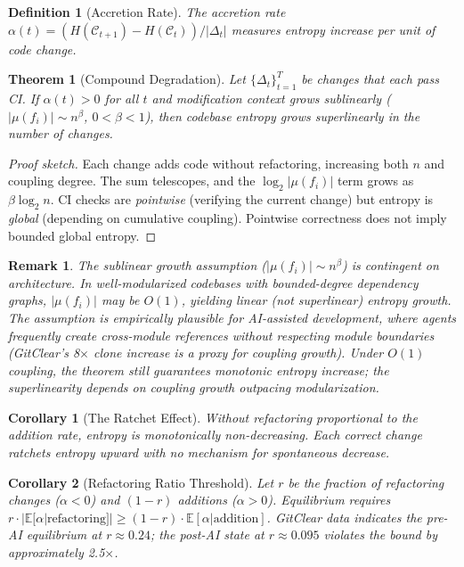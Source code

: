 \documentclass[11pt, a4paper, logo, copyright]{googledeepmind}
\newtheorem{definition}{Definition}[section]
\newtheorem{theorem}{Theorem}[section]
\newtheorem{corollary}{Corollary}[section]
\newtheorem*{remark}{Remark}
\begin{document}
\begin{definition}[Accretion Rate]
The accretion rate $\alpha(t) = (H(\mathcal{C}_{t+1}) - H(\mathcal{C}_t)) / |\Delta_t|$ measures entropy increase per unit of code change.
\end{definition}

\begin{theorem}[Compound Degradation]
\label{thm:compound}
Let $\{\Delta_t\}_{t=1}^{T}$ be changes that each pass CI. If $\alpha(t) > 0$ for all $t$ and modification context grows sublinearly ($|\mu(f_i)| \sim n^\beta$, $0 < \beta < 1$), then codebase entropy grows superlinearly in the number of changes.
\end{theorem}

\begin{proof}[Proof sketch]
Each change adds code without refactoring, increasing both $n$ and coupling degree. The sum telescopes, and the $\log_2 |\mu(f_i)|$ term grows as $\beta \log_2 n$. CI checks are \emph{pointwise} (verifying the current change) but entropy is \emph{global} (depending on cumulative coupling). Pointwise correctness does not imply bounded global entropy.
\end{proof}

\begin{remark}
The sublinear growth assumption ($|\mu(f_i)| \sim n^\beta$) is contingent on architecture. In well-modularized codebases with bounded-degree dependency graphs, $|\mu(f_i)|$ may be $O(1)$, yielding linear (not superlinear) entropy growth. The assumption is empirically plausible for AI-assisted development, where agents frequently create cross-module references without respecting module boundaries (GitClear's 8$\times$ clone increase is a proxy for coupling growth). Under $O(1)$ coupling, the theorem still guarantees monotonic entropy increase; the superlinearity depends on coupling growth outpacing modularization.
\end{remark}

\begin{corollary}[The Ratchet Effect]
Without refactoring proportional to the addition rate, entropy is monotonically non-decreasing. Each correct change ratchets entropy upward with no mechanism for spontaneous decrease.
\end{corollary}

\begin{corollary}[Refactoring Ratio Threshold]
\label{cor:refactoring}
Let $r$ be the fraction of refactoring changes ($\alpha < 0$) and $(1-r)$ additions ($\alpha > 0$). Equilibrium requires $r \cdot |\mathbb{E}[\alpha | \text{refactoring}]| \geq (1-r) \cdot \mathbb{E}[\alpha | \text{addition}]$. GitClear data indicates the pre-AI equilibrium at $r \approx 0.24$; the post-AI state at $r \approx 0.095$ violates the bound by approximately 2.5$\times$.
\end{corollary}
\end{document}
